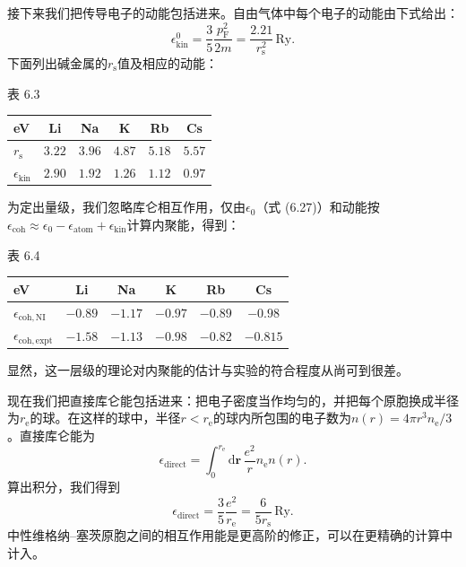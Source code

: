 接下来我们把传导电子的动能包括进来。自由气体中每个电子的动能由下式给出：
\begin{equation*}
\epsilon_{\mathrm{kin}}^0 = \frac{3}{5}\frac{p_{\mathrm{F}}^2}{2m} = \frac{2.21}{r_{\mathrm{s}}^2}\,\mathrm{Ry}.
\tag{6.28}
\end{equation*}
下面列出碱金属的$r_{\mathrm{s}}$值及相应的动能：

\begin{center}
表 6.3\\[4pt]
\begin{tabular}{lccccc}
\toprule
eV & Li & Na & K & Rb & Cs\\
\midrule
$r_{\mathrm{s}}$ & $3.22$ & $3.96$ & $4.87$ & $5.18$ & $5.57$\\
$\epsilon_{\mathrm{kin}}$ & $2.90$ & $1.92$ & $1.26$ & $1.12$ & $0.97$\\
\bottomrule
\end{tabular}
\end{center}

为定出量级，我们忽略库仑相互作用，仅由$\epsilon_0$（式 (6.27)）和动能按$\epsilon_{\mathrm{coh}} \approx \epsilon_0 - \epsilon_{\mathrm{atom}} + \epsilon_{\mathrm{kin}}$计算内聚能，得到：

\begin{center}
表 6.4\\[4pt]
\begin{tabular}{lccccc}
\toprule
eV & Li & Na & K & Rb & Cs\\
\midrule
$\epsilon_{\mathrm{coh,NI}}$ & $-0.89$ & $-1.17$ & $-0.97$ & $-0.89$ & $-0.98$\\
$\epsilon_{\mathrm{coh,expt}}$ & $-1.58$ & $-1.13$ & $-0.98$ & $-0.82$ & $-0.815$\\
\bottomrule
\end{tabular}
\end{center}

显然，这一层级的理论对内聚能的估计与实验的符合程度从尚可到很差。

现在我们把直接库仑能包括进来：把电子密度当作均匀的，并把每个原胞换成半径为$r_{\mathrm{e}}$的球。在这样的球中，半径$r < r_{\mathrm{e}}$的球内所包围的电子数为$n(r) = 4\pi r^3 n_{\mathrm{e}}/3$。直接库仑能为
\begin{equation*}
\epsilon_{\mathrm{direct}} = \int_0^{r_{\mathrm{e}}} \mathrm{d}\mathbf{r}\,\frac{e^2}{r}n_{\mathrm{e}}n(r).
\tag{6.29}
\end{equation*}
算出积分，我们得到
\begin{equation*}
\epsilon_{\mathrm{direct}} = \frac{3}{5}\frac{e^2}{r_{\mathrm{e}}} = \frac{6}{5r_{\mathrm{s}}}\,\mathrm{Ry}.
\tag{6.30}
\end{equation*}
中性维格纳–塞茨原胞之间的相互作用能是更高阶的修正，可以在更精确的计算中计入。

